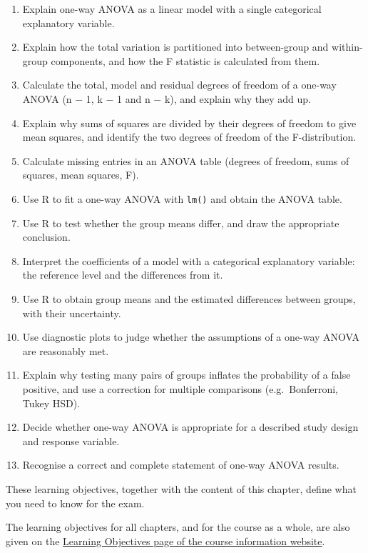 \documentclass[
  letterpaper,
  8pt,
  a4paper]{book}
\providecommand{\tightlist}{%
  \setlength{\itemsep}{0pt}\setlength{\parskip}{0pt}}
\begin{document}
\begin{tcolorbox}
\begin{enumerate}
\def\labelenumi{\arabic{enumi}.}
\tightlist
\item
  Explain one-way ANOVA as a linear model with a single categorical
  explanatory variable.
\item
  Explain how the total variation is partitioned into between-group and
  within-group components, and how the F statistic is calculated from
  them.
\item
  Calculate the total, model and residual degrees of freedom of a
  one-way ANOVA (n − 1, k − 1 and n − k), and explain why they add up.
\item
  Explain why sums of squares are divided by their degrees of freedom to
  give mean squares, and identify the two degrees of freedom of the
  F-distribution.
\item
  Calculate missing entries in an ANOVA table (degrees of freedom, sums
  of squares, mean squares, F).
\item
  Use R to fit a one-way ANOVA with \texttt{lm()} and obtain the ANOVA
  table.
\item
  Use R to test whether the group means differ, and draw the appropriate
  conclusion.
\item
  Interpret the coefficients of a model with a categorical explanatory
  variable: the reference level and the differences from it.
\item
  Use R to obtain group means and the estimated differences between
  groups, with their uncertainty.
\item
  Use diagnostic plots to judge whether the assumptions of a one-way
  ANOVA are reasonably met.
\item
  Explain why testing many pairs of groups inflates the probability of a
  false positive, and use a correction for multiple comparisons
  (e.g.~Bonferroni, Tukey HSD).
\item
  Decide whether one-way ANOVA is appropriate for a described study
  design and response variable.
\item
  Recognise a correct and complete statement of one-way ANOVA results.
\end{enumerate}

These learning objectives, together with the content of this chapter,
define what you need to know for the exam.

The learning objectives for all chapters, and for the course as a whole,
are also given on the
\href{https://opetchey.github.io/BIO144_Course_Information/3.1-learning-objectives.html}{Learning
Objectives page of the course information website}.

\end{tcolorbox}
\end{document}
